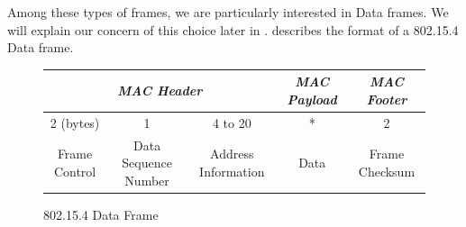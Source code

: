 Among these types of frames, we are particularly interested in Data frames. We will explain our concern of this choice later in .  describes the format of a 802.15.4 Data frame.

\begin{figure}[h!]
	\centering
	\begin{tabular}{|c|c|c|c|c|}
		\multicolumn{3}{c}{\textit{MAC Header}}                           & \multicolumn{1}{c}{\textit{MAC Payload}} & \multicolumn{1}{c}{\textit{MAC Footer}}     \\ \hline
		2 (bytes)     & 1                    & 4 to 20              & *           & 2              \\ \hline
		Frame Control & Data Sequence Number & Address Information & Data        & Frame Checksum \\ \hline
	\end{tabular}
	\caption{802.15.4 Data Frame}
	\label{Fig: 802154 frame}
\end{figure}

